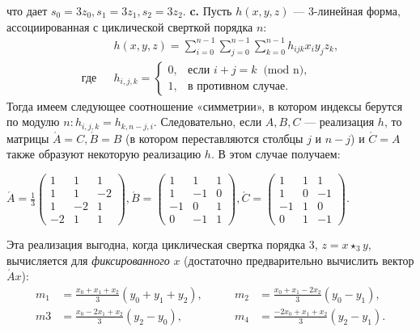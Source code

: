 \documentclass{../../template/mai_book}
\begin{document}
\noindent
что дает $s_0 = 3z_0 , s_1 = 3z_1 , s_2 = 3z_2$. \newline \newline
\indent \textbf{c.} Пусть $h(x,y,z)$ --- 3-линейная форма, ассоциированная с цикли­ческой сверткой порядка $n:$ \newline
\begin{align*}
&h(x,y,z) = \sum_{i=0}^{n-1} \sum_{j=0}^{n-1} \sum_{k=0}^{n-1} h_{ijk} x_i y_{j} z_k, \\
\text{где} \; \; \, &h_{i,j,k} = \begin{cases}
0, & \text{если $i+j = k \: $ (mod n)}, \\
1, & \text{в противном случае}.
\end{cases}
\end{align*}
Тогда имеем следующее соотношение «симметрии», в котором индексы 
берутся по модулю $n: h_{i,j,k} = h_{k,n-j,i}$. Следовательно, если $A, B, C$ --- реализация $h$, то матрицы $\acute A = C, \acute B = B$ (в котором переставляются столбцы $j$ и $n - j$) и $\acute C = A$ также образуют некоторую реализацию $h$. В этом случае получаем: 
\begin{center}
$\acute A = \frac{1}3 \begin{pmatrix}
1 & 1 & 1 \\
1 & 1 & -2 \\         
1 & -2 & 1\\
-2 & 1 & 1
\end{pmatrix} ,
\acute B = \begin{pmatrix}
1 & 1 & 1 \\
1 & -1 & 0 \\         
-1 & 0 & 1\\
0 & -1 & 1
\end{pmatrix} ,
\acute C = \begin{pmatrix}
1 & 1 & 1 \\
1 & 0 & -1 \\         
-1 & 1 & 0\\
0 & 1 & -1
\end{pmatrix} . $
\end{center}
Эта реализация выгодна, когда циклическая свертка порядка 3, $z = x\star_3 y$, вычисляется для {\itshape фиксированного} $x$ (достаточно предварительно вычислить вектор $\acute A x$):
\begin{align*}
m_1 &= \frac{x_0 + x_1 + x_2}3 (y_0 + y_1 + y_2), &\qquad m_2
&= \frac{x_0 + x_1 -2x_2}3 (y_0 - y_1),\\
m3 &= \frac{x_0 -2x_1 + x_2}3 (y_2 - y_0),   &\qquad m_4 &= \frac{-2x_0 + x_1 + x_2}3 (y_2 - y_1).
\end{align*}
\end{document}
